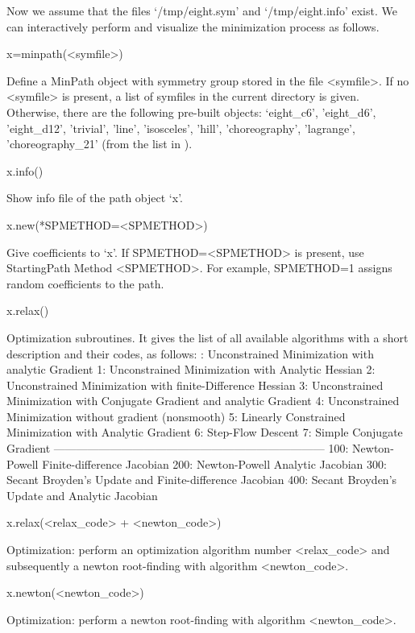 
Now we assume that  the files `/tmp/eight.sym' and `/tmp/eight.info' exist. 
We can interactively perform and visualize the minimization process
as follows.


\> x=minpath(<symfile>)

Define a MinPath object with symmetry group stored in  the 
file <symfile>. 
If no <symfile> is present, a list of symfiles in the current
directory is given.
Otherwise, there are the following pre-built objects:
`eight_c6', 
'eight_d6',
'eight_d12',
'trivial',
'line',
'isosceles',
'hill',
'choreography',
'lagrange',
'choreography_21' (from the list in \cite{zz}).


\> x.info()

Show info file of the path object `x'.

\> x.new(*SPMETHOD=<SPMETHOD>)

Give coefficients to `x'. If SPMETHOD=<SPMETHOD> is present,
use StartingPath Method <SPMETHOD>. For example, SPMETHOD=1
assigns random coefficients to the path.



\> x.relax() 

Optimization subroutines. It gives the list of all available algorithms
with a short description and their codes, as follows:
:      Unconstrained Minimization with analytic Gradient
1:      Unconstrained Minimization with Analytic Hessian
2:      Unconstrained Minimization with finite-Difference 
Hessian
3:      Unconstrained Minimization with Conjugate 
Gradient and analytic Gradient
4:      Unconstrained Minimization without gradient 
(nonsmooth)
5:      Linearly Constrained Minimization with Analytic 
Gradient
6:      Step-Flow Descent
7:      Simple Conjugate Gradient
------------------------------------------------------------------------
100:    Newton-Powell Finite-difference Jacobian
200:    Newton-Powell Analytic Jacobian
300:    Secant Broyden's Update and Finite-difference 
Jacobian
400:    Secant Broyden's Update and Analytic Jacobian
\endtt


\> x.relax(<relax\_code> + <newton\_code>)

Optimization:  perform an optimization algorithm number <relax_code>
and subsequently a newton root-finding with algorithm <newton_code>.

\> x.newton(<newton_code>)

Optimization:  perform
a newton root-finding with algorithm <newton_code>.



